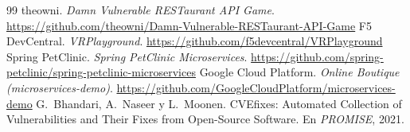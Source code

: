 \documentclass[12pt,a4paper]{article}
\begin{document}
\begin{thebibliography}{99}
 theowni. \emph{Damn Vulnerable RESTaurant API Game}. \url{https://github.com/theowni/Damn-Vulnerable-RESTaurant-API-Game}
 F5 DevCentral. \emph{VRPlayground}. \url{https://github.com/f5devcentral/VRPlayground}
 Spring PetClinic. \emph{Spring PetClinic Microservices}. \url{https://github.com/spring-petclinic/spring-petclinic-microservices}
 Google Cloud Platform. \emph{Online Boutique (microservices-demo)}. \url{https://github.com/GoogleCloudPlatform/microservices-demo}
 G.~Bhandari, A.~Naseer y L.~Moonen. CVEfixes: Automated Collection of Vulnerabilities and Their Fixes from Open-Source Software. En \emph{PROMISE}, 2021.
\end{thebibliography}

\appendix
\end{document}
